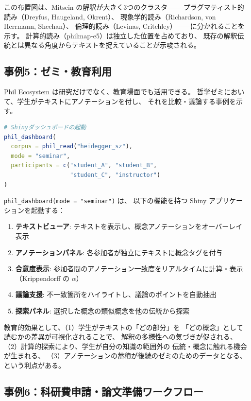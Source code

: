 \documentclass[a4paper,11pt]{ltjsarticle}
\begin{document}
この布置図は、Mitsein の解釈が大きく3つのクラスタ——
プラグマティスト的読み（Dreyfus, Haugeland, Okrent）、
現象学的読み（Richardson, von Herrmann, Sheehan）、
倫理的読み（Levinas, Critchley）——に分かれることを示す。
計算的読み（philmap-e5）は独立した位置を占めており、
既存の解釈伝統とは異なる角度からテキストを捉えていることが示唆される。

\subsection{事例5：ゼミ・教育利用}\label{sec:case5}

Phil Ecosystem は研究だけでなく、教育場面でも活用できる。
哲学ゼミにおいて、学生がテキストにアノテーションを付し、
それを比較・議論する事例を示す。

\begin{lstlisting}[language=R,caption=ゼミでのインタラクティブ分析]
# Shinyダッシュボードの起動
phil_dashboard(
  corpus = phil_read("heidegger_sz"),
  mode = "seminar",
  participants = c("student_A", "student_B",
                   "student_C", "instructor")
)
\end{lstlisting}

\texttt{phil\_dashboard(mode = "seminar")} は、
以下の機能を持つ Shiny アプリケーションを起動する：

\begin{enumerate}[leftmargin=2em]
  \item \textbf{テキストビューア}: テキストを表示し、概念アノテーションをオーバーレイ表示
  \item \textbf{アノテーションパネル}: 各参加者が独立にテキストに概念タグを付与
  \item \textbf{合意度表示}: 参加者間のアノテーション一致度をリアルタイムに計算・表示（Krippendorff の $\alpha$）
  \item \textbf{議論支援}: 不一致箇所をハイライトし、議論のポイントを自動抽出
  \item \textbf{探索パネル}: 選択した概念の類似概念を他の伝統から探索
\end{enumerate}

教育的効果として、（1）学生がテキストの「どの部分」を
「どの概念」として読むかの差異が可視化されることで、
解釈の多様性への気づきが促される、
（2）計算的探索により、学生が自分の知識の範囲外の
伝統・概念に触れる機会が生まれる、
（3）アノテーションの蓄積が後続のゼミのためのデータとなる、
という利点がある。

\subsection{事例6：科研費申請・論文準備ワークフロー}\label{sec:case6}
\end{document}
